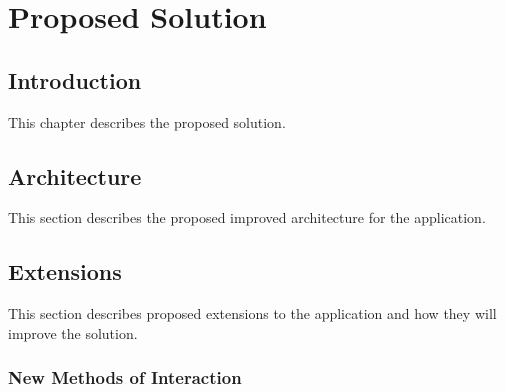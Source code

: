 
\chapter{Proposed Solution}

\label{Chapter3}



\section{Introduction}

This chapter describes the proposed solution.


\section{Architecture}

This section describes the proposed improved architecture for the application.


\section{Extensions}

This section describes proposed extensions to the application and how they will improve the solution.


\subsection{New Methods of Interaction}

